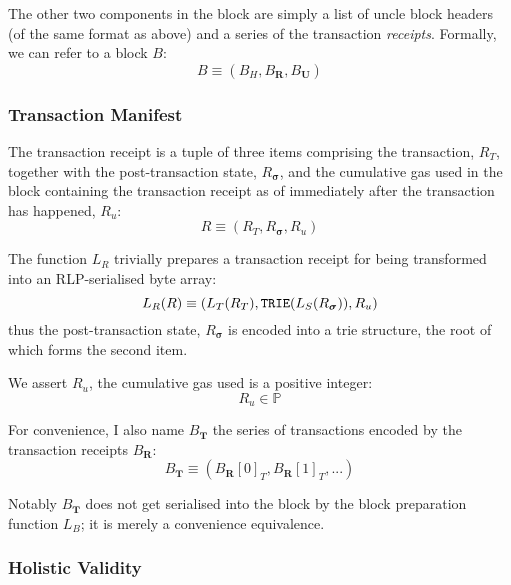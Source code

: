 \documentclass[9pt,oneside]{amsart}
\begin{document}
\begin{multicols}{2}
The other two components in the block are simply a list of uncle block headers (of the same format as above) and a series of the transaction \textit{receipts}. Formally, we can refer to a block $B$:
\begin{equation}
B \equiv (B_H, B_\mathbf{R}, B_\mathbf{U})
\end{equation}

\subsubsection{Transaction Manifest}

The transaction receipt is a tuple of three items comprising the transaction, $R_T$, together with the post-transaction state, $R_{\boldsymbol{\sigma}}$, and the cumulative gas used in the block containing the transaction receipt as of immediately after the transaction has happened, $R_u$:
\begin{equation}
R \equiv (R_T, R_{\boldsymbol{\sigma}}, R_u)
\end{equation}

The function $L_R$ trivially prepares a transaction receipt for being transformed into an RLP-serialised byte array:
\begin{equation}
L_R(R) \equiv (L_T(R_T), \mathtt{\small TRIE}(L_S(R_{\boldsymbol{\sigma}})), R_u)
\end{equation}
thus the post-transaction state, $R_{\boldsymbol{\sigma}}$ is encoded into a trie structure, the root of which forms the second item.

We assert $R_u$, the cumulative gas used is a positive integer:
\begin{equation}
R_u \in \mathbb{P}
\end{equation}

For convenience, I also name $B_\mathbf{T}$ the series of transactions encoded by the transaction receipts $B_\mathbf{R}$:
\begin{equation}
B_\mathbf{T} \equiv (B_\mathbf{R}[0]_T, B_\mathbf{R}[1]_T, ...)
\end{equation}

Notably $B_\mathbf{T}$ does not get serialised into the block by the block preparation function $L_B$; it is merely a convenience equivalence.

\subsubsection{Holistic Validity}


\end{multicols}
\end{document}
